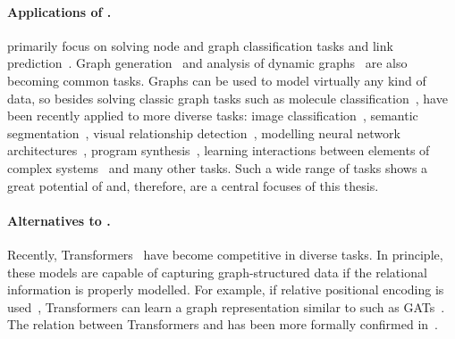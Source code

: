 \vspace{-3pt}
\paragraph{Applications of \gnns.} \gnns primarily focus on solving node and graph classification tasks and link prediction~\citep{hamilton2017representation,wu2020comprehensive,battaglia2018relational}. Graph generation~\citep{you2018graphrnn,liao2019efficient} and analysis of dynamic graphs~\citep{kazemi2019relational,trivedi2019dyrep} are also becoming common tasks. Graphs can be used to model virtually any kind of data, so besides solving classic graph tasks such as molecule classification~\citep{xu2018how,knyazev2018spectral}, \gnns have been recently applied to more diverse tasks: image classification~\citep{knyazev2019image,meyer2020large}, semantic segmentation~\citep{li2018beyond,zhang2019dual}, visual relationship detection~\citep{xu2017scene,yang2018graph}, modelling neural network architectures~\citep{zhang2018graph,wen2020neural}, program synthesis~\citep{zhang2018neural}, learning interactions between elements of complex systems~\citep{kipf2018neural,bapst2019structured} and many other tasks. Such a wide range of tasks shows a great potential of \gnns and, therefore, \gnns are a central focuses of this thesis.

\paragraph{Alternatives to \gnns.} Recently, Transformers~\citep{vaswani2017attention,dosovitskiy2020image} have become competitive in diverse tasks. In principle, these models are capable of capturing graph-structured data if the relational information is properly modelled. For example, if relative positional encoding is used~\citep{shaw2018self}, Transformers can learn a graph representation similar to such \gnns as GATs~\citep{velickovic2017graph}. The relation between Transformers and \gnns has been more formally confirmed in~\citep{dwivedi2020generalization,yun2019graph}.


